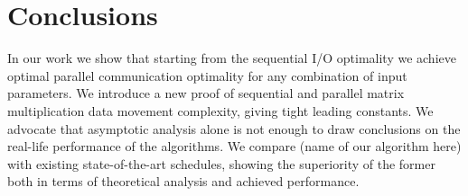 \documentclass[sigplan,review,anonymous,10pt]{acmart}\settopmatter{printfolios=true,printccs=false,printacmref=false}
\newcommand\greg[1]{\textcolor{blue}{[Greg: #1]}}
\begin{document}
\section{Conclusions}
In our work we show that starting from the sequential I/O optimality we achieve 
optimal parallel communication optimality for any combination of input 
parameters. We introduce a new proof of sequential and parallel matrix 
multiplication data movement complexity, giving tight leading constants. We 
advocate that asymptotic analysis alone is not enough to draw conclusions on 
the real-life performance of the algorithms. We 
compare (name of our algorithm here) with existing state-of-the-art schedules, 
showing the 
superiority of the former both in terms of theoretical analysis and achieved 
performance.

%

%
\end{document}
